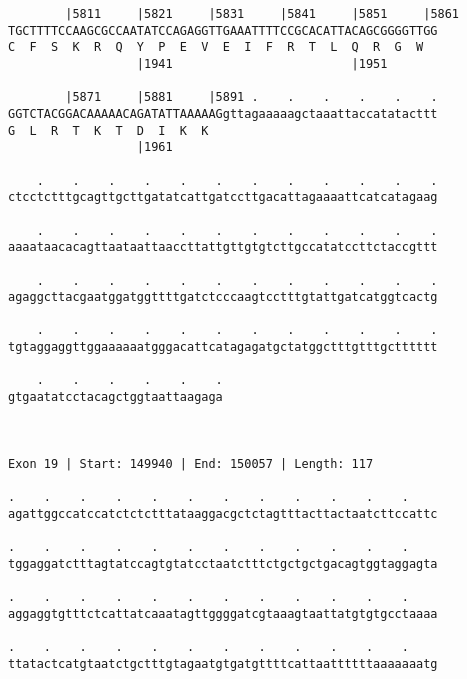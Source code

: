 \documentclass{article}
\begin{document}
\begin{Verbatim}
        |5811     |5821     |5831     |5841     |5851     |5861
TGCTTTTCCAAGCGCCAATATCCAGAGGTTGAAATTTTCCGCACATTACAGCGGGGTTGG
C  F  S  K  R  Q  Y  P  E  V  E  I  F  R  T  L  Q  R  G  W  
                  |1941                         |1951       
  
        |5871     |5881     |5891 .    .    .    .    .    .
GGTCTACGGACAAAAACAGATATTAAAAAGgttagaaaaagctaaattaccatatacttt
G  L  R  T  K  T  D  I  K  K                                
                  |1961                                     
  
    .    .    .    .    .    .    .    .    .    .    .    .
ctcctctttgcagttgcttgatatcattgatccttgacattagaaaattcatcatagaag
                                                            
    .    .    .    .    .    .    .    .    .    .    .    .
aaaataacacagttaataattaaccttattgttgtgtcttgccatatccttctaccgttt
                                                            
    .    .    .    .    .    .    .    .    .    .    .    .
agaggcttacgaatggatggttttgatctcccaagtcctttgtattgatcatggtcactg
                                                            
    .    .    .    .    .    .    .    .    .    .    .    .
tgtaggaggttggaaaaaatgggacattcatagagatgctatggctttgtttgctttttt
                                                            
    .    .    .    .    .    .
gtgaatatcctacagctggtaattaagaga
                              
                              
 
Exon 19 | Start: 149940 | End: 150057 | Length: 117
 
.    .    .    .    .    .    .    .    .    .    .    .    
agattggccatccatctctctttataaggacgctctagtttacttactaatcttccattc
                                                            
.    .    .    .    .    .    .    .    .    .    .    .    
tggaggatctttagtatccagtgtatcctaatctttctgctgctgacagtggtaggagta
                                                            
.    .    .    .    .    .    .    .    .    .    .    .    
aggaggtgtttctcattatcaaatagttggggatcgtaaagtaattatgtgtgcctaaaa
                                                            
.    .    .    .    .    .    .    .    .    .    .    .    
ttatactcatgtaatctgctttgtagaatgtgatgttttcattaattttttaaaaaaatg
                                                            

\end{Verbatim}
\end{document}
